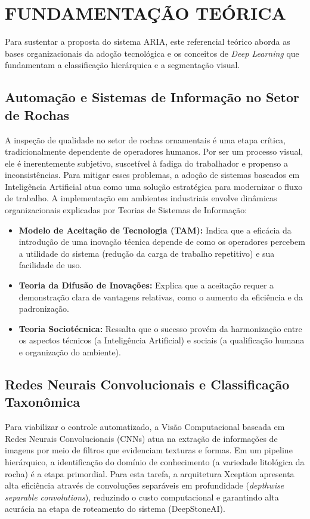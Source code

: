 \chapter[FUNDAMENTAÇÃO TEÓRICA]{FUNDAMENTAÇÃO TEÓRICA}

Para sustentar a proposta do sistema ARIA, este referencial teórico aborda as bases organizacionais da adoção tecnológica e os conceitos de \textit{Deep Learning} que fundamentam a classificação hierárquica e a segmentação visual.

\section{Automação e Sistemas de Informação no Setor de Rochas}
A inspeção de qualidade no setor de rochas ornamentais é uma etapa crítica, tradicionalmente dependente de operadores humanos. Por ser um processo visual, ele é inerentemente subjetivo, suscetível à fadiga do trabalhador e propenso a inconsistências. Para mitigar esses problemas, a adoção de sistemas baseados em Inteligência Artificial atua como uma solução estratégica para modernizar o fluxo de trabalho. A implementação em ambientes industriais envolve dinâmicas organizacionais explicadas por Teorias de Sistemas de Informação:
\begin{itemize}
    \item \textbf{Modelo de Aceitação de Tecnologia (TAM):} Indica que a eficácia da introdução de uma inovação técnica depende de como os operadores percebem a utilidade do sistema (redução da carga de trabalho repetitivo) e sua facilidade de uso.
    \item \textbf{Teoria da Difusão de Inovações:} Explica que a aceitação requer a demonstração clara de vantagens relativas, como o aumento da eficiência e da padronização.
    \item \textbf{Teoria Sociotécnica:} Ressalta que o sucesso provém da harmonização entre os aspectos técnicos (a Inteligência Artificial) e sociais (a qualificação humana e organização do ambiente).
\end{itemize}

\section{Redes Neurais Convolucionais e Classificação Taxonômica}
Para viabilizar o controle automatizado, a Visão Computacional baseada em Redes Neurais Convolucionais (CNNs) atua na extração de informações de imagens por meio de filtros que evidenciam texturas e formas. Em um pipeline hierárquico, a identificação do domínio de conhecimento (a variedade litológica da rocha) é a etapa primordial. Para esta tarefa, a arquitetura Xception apresenta alta eficiência através de convoluções separáveis em profundidade (\textit{depthwise separable convolutions}), reduzindo o custo computacional e garantindo alta acurácia na etapa de roteamento do sistema (DeepStoneAI).

